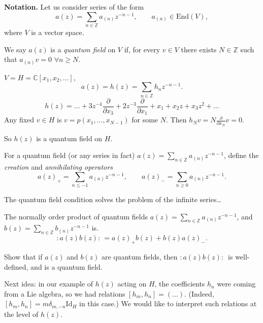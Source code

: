 \medskip\noindent
{\bf Notation.} Let us consider series of the
form
$$
a(z)=\sum_{n \in
\mathbb{Z}}a_{(n)}z^{-n-1},\qquad a_{(n)}\in
\text{End}(V),
$$
where $V$ is a vector space.

\begin{definition}
\label{definition-quantum-field}
We say $a(z)$ is a {\it quantum field} on $V$
if,
for every $v \in V$ there exists $N \in
\mathbb{Z}$
such that $a_{(n)}v=0$ $\forall  n\geq N$.
\end{definition}

\begin{example}
\label{example-quantum-field}
$V=H=\mathbb{C}[x_1,x_2,\ldots]$,
$$
a(z)=h(z)=\sum_{n \in \mathbb{Z}}h_n
z^{-n-1}.
$$
$$
h(z)=\ldots+3z^{-4}\frac{\partial }{\partial
x_3}
+2z^{-3}\frac{\partial }{\partial x_1}+x_1
+x_2z+x_3z^2+\ldots
$$
Any fixed $v \in H$ is
$v=p(x_1,\ldots,x_{N-1})$ for some $N$.
Then $h_Nv=N \frac{\partial }{\partial
x_N}v=0$.

So $h(z)$ is a quantum field on $H$.
\end{example}

\begin{definition}
\label{definition-creat-annih-opera}
For a quantum field
(or any series in fact) $a(z)=\sum_{ n \in
\mathbb{Z}}a_{(n)}z^{-n-1}$,
define the {\it creation} and {\it
annihilating operators}
$$
a(z)_+=\sum_{n \leq -1}a_{(n)}z^{-n-1},\qquad
a(z)_-=\sum_{n \geq 0}a_{(n)}z^{-n-1}.
$$
\end{definition}

The quantum field condition solves the
problem of the infinite series…

The normally order product of quantum fields
$a(z)=\sum_{n \in
\mathbb{Z}}a_{(n)}z^{-n-1}$, and
$b(z)=\sum_{n \in \mathbb{Z}}b_{(n)}z^{-n-1}$
is.
$$
:\!a(z)b(z)\!:\,=a(z)_+b(z)+b(z)a(z)_-.
$$

\begin{exercise}
\label{exercise-most-important}
Show that if $a(z)$ and $b(z)$ are quantum
fields,
then $:\!a(z)b(z)\!:\,$ is well-defined, and
is a quantum field.
\end{exercise}

\medskip\noindent
Next idea: in our example of $h(z)$ acting on
$H$,
the coefficients $h_n$ were coming from a Lie
algebra,
so we had relations
 $[h_m,h_n]=(\ldots)$.
(Indeed, $[h_m,h_n]=m
\delta_{m,-n}\text{Id}_H$ in this case.)
We would like to interpret such relations at
the level of $h(z)$.

